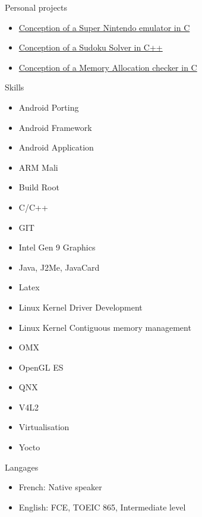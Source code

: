 \documentclass[a4paper, 10pt]{article}
\begin{document}
\begin{unbreakableSection} {Personal projects}
    \begin{projects}
	\begin{itemize}[parsep=0cm,itemsep=0cm,topsep=0cm]
	    \item \href{https://github.com/grassead/snesemu}{Conception of a Super Nintendo emulator in C}
	    \item \href{https://github.com/grassead/sudokusolver}{Conception of a Sudoku Solver in C++}
	    \item \href{https://github.com/grassead/memorychecker}{Conception of a Memory Allocation checker in C}
	\end{itemize}
    \end{projects}
\end{unbreakableSection}

\begin{section} {Skills}
    \begin{skills}
	\begin{itemize}[parsep=0cm,itemsep=0cm,topsep=0cm]
	    \item Android Porting
	    \item Android Framework
	    \item Android Application
	    \item ARM Mali
	    \item Build Root
	    \item C/C++
	    \item GIT
	    \item Intel Gen 9 Graphics
	    \item Java, J2Me, JavaCard
	    \item Latex
	    \item Linux Kernel Driver Development
	    \item Linux Kernel Contiguous memory management
	    \item OMX
	    \item OpenGL ES
	    \item QNX
	    \item V4L2
	    \item Virtualisation
	    \item Yocto
	\end{itemize}
    \end{skills}
\end{section}

\begin{section} {Langages}
    \begin{languages}
	\begin{itemize}[parsep=0cm,itemsep=0cm,topsep=0cm]
	    \item French: Native speaker
	    \item English: FCE, TOEIC 865, Intermediate level
	\end{itemize}
    \end{languages}
\end{section}
\end{document}
